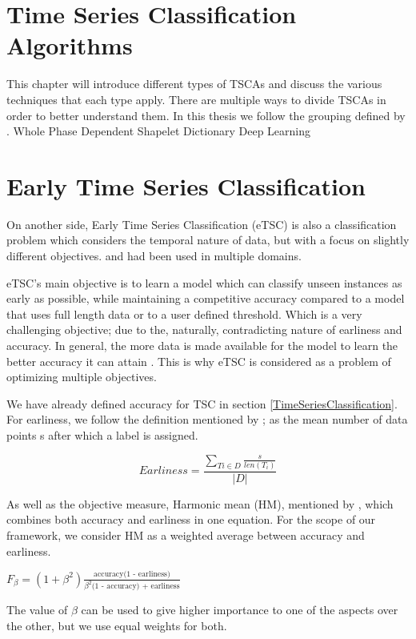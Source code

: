 \section{Time Series Classification Algorithms}
\label{SectionTSCA}
This chapter will introduce different types of TSCAs and discuss the various techniques that each type apply.
There are multiple ways to divide TSCAs in order to better understand them.
In this thesis we follow the grouping defined by \cite{bagnall2017great}.
{Whole}
{Phase Dependent}
{Shapelet}
{Dictionary}
{Deep Learning}

\section{Early Time Series Classification}
\label{EarlyTimeSeriesClassification}
On another side, Early Time Series Classification (eTSC) is also a classification problem which considers the temporal nature of data,
but with a focus on slightly different objectives.  and had been used in multiple domains.

eTSC's main objective is to learn a model which can classify unseen instances as early as possible,
while maintaining a competitive accuracy compared to a model that uses full length data or to a user defined threshold\cite{xing2009early}.
Which is a very challenging objective; due to the, naturally, contradicting nature of earliness and accuracy.
In general, the more data is made available for the model to learn the better accuracy it can attain \cite{mori2019early,tavenard2016cost,xing2012early,mori2017reliable}.
This is why eTSC is considered as a problem of optimizing multiple objectives.

We have already defined accuracy for TSC in section \ref{TimeSeriesClassification}.
For earliness, we follow the definition mentioned by \cite{schafer2020teaser}; as the mean number of data points s after which a label is assigned.
\begin{definition}
    \label{DefinitionEarliness}
    \[ \textstyle Earliness = \frac{\sum_{T{i}\in D}\frac{s}{len(T_{i})}}{|D|} \]
\end{definition}
As well as the objective measure, Harmonic mean (HM), mentioned by \cite{ghalwash2012early,schafer2020teaser}, which combines both accuracy and earliness in one equation.
For the scope of our framework, we consider HM as a weighted average between accuracy and earliness.
\begin{definition}
    \label{DefinitionHM}
    $F_{\beta} = (1 + \beta^2)\frac{\text{accuracy(1 - earliness)}}{\beta^2 \text{(1 - accuracy) + earliness}}$
\end{definition}
The value of $\beta$ can be used to give higher importance to one of the aspects over the other, but we use equal weights for both.

